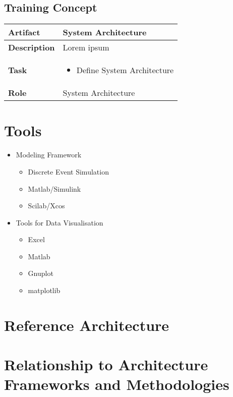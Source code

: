 \subsection{Training Concept}
 \label{table:ch6_Role_Service_Developer}
\begin{tabular}
	{|m{2cm}|m{10cm}|} \hline \bfseries Artifact & System Architecture\\
	\hline \bfseries Description & Lorem ipsum\\
	\hline \bfseries Task & 
	\begin{itemize}
		\item Define System Architecture 
	\end{itemize}
	\\
	\hline \bfseries Role & System Architecture\\
	\hline 
\end{tabular}

\section{Tools} %
\label{sec:ch6_tools}

\begin{itemize}
	\item Modeling Framework
	\begin{itemize}
		\item Discrete Event Simulation
		\item Matlab/Simulink
		\item Scilab/Xcos
	\end{itemize}
	\item Tools for Data Visualisation
	\begin{itemize}
		\item Excel
		\item Matlab
		\item Gnuplot
		\item matplotlib
	\end{itemize}
\end{itemize}


\section{Reference Architecture}

\section{Relationship to Architecture Frameworks and Methodologies} %
\label{sec:ch6_relation_frameworks}

